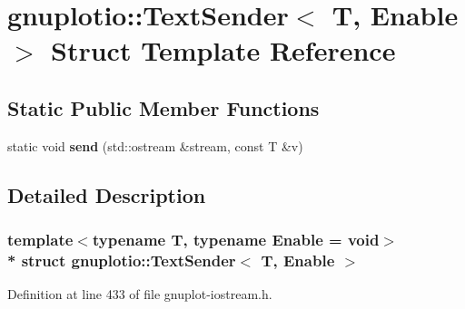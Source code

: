 \hypertarget{structgnuplotio_1_1_text_sender}{}\section{gnuplotio\+:\+:Text\+Sender$<$ T, Enable $>$ Struct Template Reference}
\label{structgnuplotio_1_1_text_sender}
\subsection*{Static Public Member Functions}
\begin{DoxyCompactItemize}
\item 
static void {\bfseries send} (std\+::ostream \&stream, const T \&v)\hypertarget{structgnuplotio_1_1_text_sender_a03b58292dc75a4137d30ad7fffd762c6}{}\label{structgnuplotio_1_1_text_sender_a03b58292dc75a4137d30ad7fffd762c6}

\end{DoxyCompactItemize}


\subsection{Detailed Description}
\subsubsection*{template$<$typename T, typename Enable = void$>$\\*
struct gnuplotio\+::\+Text\+Sender$<$ T, Enable $>$}



Definition at line 433 of file gnuplot-\/iostream.\+h.

